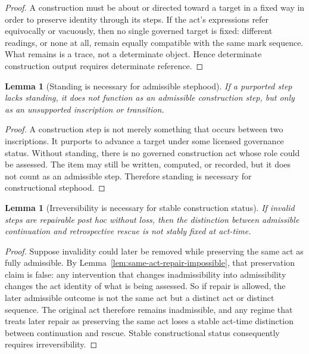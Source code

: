 \documentclass[11pt]{article}
\newtheorem{lemma}[theorem]{Lemma}
\theoremstyle{definition}
\theoremstyle{remark}
\begin{document}
\begin{proof}
A construction must be about or directed toward a target in a fixed way in order to preserve identity through its steps. If the act's expressions refer equivocally or vacuously, then no single governed target is fixed: different readings, or none at all, remain equally compatible with the same mark sequence. What remains is a trace, not a determinate object. Hence determinate construction output requires determinate reference.
\end{proof}

\begin{lemma}[Standing is necessary for admissible stephood]\label{lem:standing-necessity}
If a purported step lacks standing, it does not function as an admissible construction step, but only as an unsupported inscription or transition.
\end{lemma}

\begin{proof}
A construction step is not merely something that occurs between two inscriptions. It purports to advance a target under some licensed governance status. Without standing, there is no governed construction act whose role could be assessed. The item may still be written, computed, or recorded, but it does not count as an admissible step. Therefore standing is necessary for constructional stephood.
\end{proof}

\begin{lemma}[Irreversibility is necessary for stable construction status]\label{lem:irreversibility-necessity}
If invalid steps are repairable post hoc without loss, then the distinction between admissible continuation and retrospective rescue is not stably fixed at act-time.
\end{lemma}

\begin{proof}
Suppose invalidity could later be removed while preserving the same act as fully admissible. By Lemma~\ref{lem:same-act-repair-impossible}, that preservation claim is false: any intervention that changes inadmissibility into admissibility changes the act identity of what is being assessed. So if repair is allowed, the later admissible outcome is not the same act but a distinct act or distinct sequence. The original act therefore remains inadmissible, and any regime that treats later repair as preserving the same act loses a stable act-time distinction between continuation and rescue. Stable constructional status consequently requires irreversibility.
\end{proof}
\end{document}
